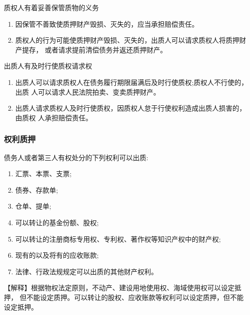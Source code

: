 \documentclass[UTF8,12pt]{ctexart}
\numberwithin{equation}{section} %
\numberwithin{figure}{section}
\numberwithin{table}{section}
\begin{document}
	质权人有着妥善保管质物的义务
	\begin{enumerate}
		\item 因保管不善致使质押财产毁损、灭失的，应当承担赔偿责任。
		
		\item 质权人的行为可能使质押财产毁损、灭失的，出质人可以请求质权人将质押财产提存， 或者请求提前清偿债务并返还质押财产。
	\end{enumerate} 
	
	出质人有及时行使质权请求权 
	\begin{enumerate}
		\item 出质人可以请求质权人在债务履行期限届满后及时行使质权;质权人不行使的，出质 人可以请求人民法院拍卖、变卖质押财产。
		
		\item 出质人请求质权人及时行使质权，因质权人怠于行使权利造成出质人损害的，由质权 人承担赔偿责任。
	\end{enumerate}
	
	\subsubsection{权利质押}
	债务人或者第三人有权处分的下列权利可以出质:
	\begin{enumerate}
		\item 汇票、本票、支票;
		
		\item 债券、存款单;
		
		\item 仓单、提单;
		
		\item 可以转让的基金份额、股权;
		
		\item 可以转让的注册商标专用权、专利权、著作权等知识产权中的财产权;
		
		\item 现有的以及将有的应收账款;
		
		\item 法律、行政法规规定可以出质的其他财产权利。 
	\end{enumerate}【解释】根据物权法定原则，不动产、建设用地使用权、海域使用权可以设定抵押， 但不能设定质押。可以转让的股权、应收账款等权利可以设定质押，但不能设定抵押。
	
\end{document}
